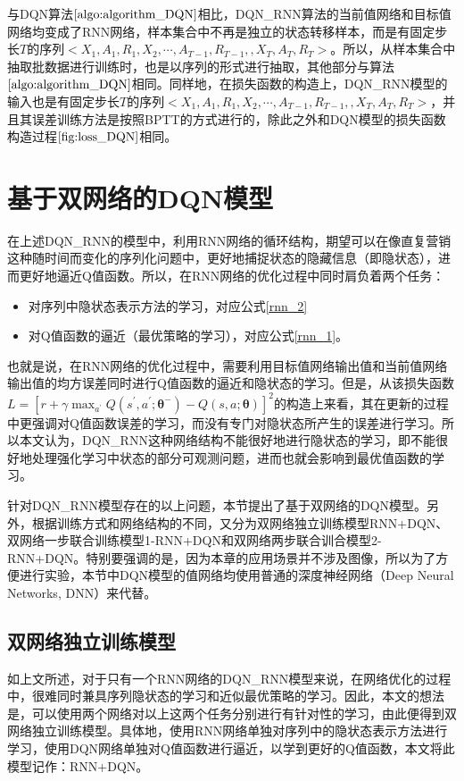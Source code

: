  与DQN算法$\ref{algo:algorithm_DQN}$相比，DQN\_RNN算法的当前值网络和目标值网络均变成了RNN网络，样本集合中不再是独立的状态转移样本，而是有固定步长$T$的序列$<X_{1}, A_{1}, R_{1}, X_{2}, \cdots, A_{T-1}, R_{T-1}, ,X_{T}, A_{T}, R_{T}>$。所以，从样本集合中抽取批数据进行训练时，也是以序列的形式进行抽取，其他部分与算法$\ref{algo:algorithm_DQN}$相同。同样地，在损失函数的构造上，DQN\_RNN模型的输入也是有固定步长$T$的序列$<X_{1}, A_{1}, R_{1}, X_{2}, \cdots, A_{T-1}, R_{T-1}, ,X_{T}, A_{T}, R_{T}>$，并且其误差训练方法是按照BPTT的方式进行的\citep{bersini1997simplification}，除此之外和DQN模型的损失函数构造过程$\ref{fig:loss_DQN}$相同。


\section{基于双网络的DQN模型}
在上述DQN\_RNN的模型中，利用RNN网络的循环结构，期望可以在像直复营销这种随时间而变化的序列化问题中，更好地捕捉状态的隐藏信息（即隐状态），进而更好地逼近Q值函数。所以，在RNN网络的优化过程中同时肩负着两个任务：

\begin{itemize}
\item 对序列中隐状态表示方法的学习，对应公式\eqref{rnn_2}
\item 对Q值函数的逼近（最优策略的学习），对应公式\eqref{rnn_1}。
\end{itemize}

也就是说，在RNN网络的优化过程中，需要利用目标值网络输出值和当前值网络输出值的均方误差同时进行Q值函数的逼近和隐状态的学习。但是，从该损失函数$L=[r+\gamma \max_{a^{'}}Q(s^{'},a^{'};\bm{\theta}^{-})-Q(s,a;\bm{\theta})]^{2}$的构造上来看，其在更新的过程中更强调对Q值函数误差的学习，而没有专门对隐状态所产生的误差进行学习。所以本文认为，DQN\_RNN这种网络结构不能很好地进行隐状态的学习，即不能很好地处理强化学习中状态的部分可观测问题，进而也就会影响到最优值函数的学习。

针对DQN\_RNN模型存在的以上问题，本节提出了基于双网络的DQN模型。另外，根据训练方式和网络结构的不同，又分为双网络独立训练模型RNN+DQN、双网络一步联合训练模型1-RNN+DQN和双网络两步联合训合模型2-RNN+DQN。特别要强调的是，因为本章的应用场景并不涉及图像，所以为了方便进行实验，本节中DQN模型的值网络均使用普通的深度神经网络（Deep Neural Networks, DNN）来代替。

\subsection{双网络独立训练模型}
如上文所述，对于只有一个RNN网络的DQN\_RNN模型来说，在网络优化的过程中，很难同时兼具序列隐状态的学习和近似最优策略的学习。因此，本文的想法是，可以使用两个网络对以上这两个任务分别进行有针对性的学习，由此便得到双网络独立训练模型。具体地，使用RNN网络单独对序列中的隐状态表示方法进行学习，使用DQN网络单独对Q值函数进行逼近，以学到更好的Q值函数，本文将此模型记作：RNN+DQN。


